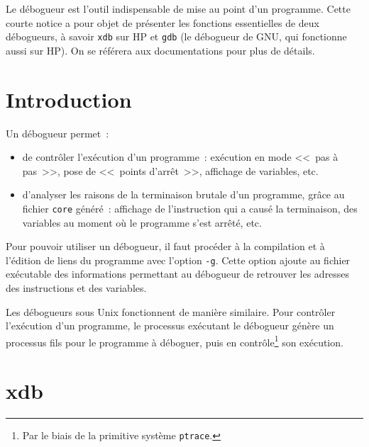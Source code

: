 %
%
%

% 
% 
% 
% 

Le débogueur est l'outil indispensable de mise au point
d'un programme. Cette courte notice a pour objet de présenter
les fonctions essentielles de deux débogueurs, à savoir
{\tt xdb} sur HP et {\tt gdb} (le débogueur de GNU, qui
fonctionne aussi sur HP). On se référera aux documentations
pour plus de détails.

\section {Introduction}

Un débogueur permet~:

\begin {itemize}
    \item de contrôler l'exécution d'un programme~:
	exécution en mode <<~pas à pas~>>, pose de
	<<~points d'arrêt~>>, affichage de
	variables, etc.
    \item d'analyser les raisons de la terminaison
	brutale d'un programme, grâce au fichier
	{\tt core} généré~: affichage de l'instruction
	qui a causé la terminaison, des variables
	au moment où le programme s'est arrêté, etc.
\end {itemize}

Pour pouvoir utiliser un débogueur, il faut procéder
à la compilation et à l'édition de liens du programme
avec l'option {\tt -g}. Cette option ajoute
au fichier exécutable des informations permettant au
débogueur de retrouver les adresses des instructions
et des variables.

Les débogueurs sous Unix fonctionnent de manière similaire.
Pour contrôler l'exécution d'un programme, le processus
exécutant le débogueur génère un processus fils pour le
programme à déboguer, puis en contrôle\footnote {Par le
biais de la primitive système {\tt ptrace}.} son
exécution.


\section {xdb}

